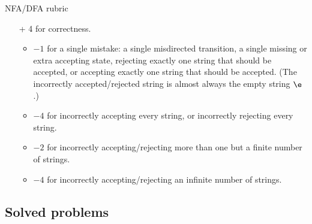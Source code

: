 \documentclass[11pt]{article}
\begin{document}
\begin{enumerate}
\begin{Rubric}{NFA/DFA rubric}
\begin{itemize}
\begin{itemize}
\item Yes, we mean it. A perfectly correct drawing of a perfectly correct DFA with no state explanation
is worth at most 6 points.
\end{itemize}
\item[+ 4] for correctness. 
\begin{itemize}
\item $-1$ for a single mistake: a single misdirected transition, a single missing or extra accepting state,
rejecting exactly one string that should be accepted, or accepting exactly one string that should
be accepted. (The incorrectly accepted/rejected string is almost always the empty string $\e$.)
\item $-4$ for incorrectly accepting every string, or incorrectly rejecting every string.
\item $-2$ for incorrectly accepting/rejecting more than one but a finite number of strings.
\item $-4$ for incorrectly accepting/rejecting an infinite number of strings.
\end{itemize}
\end{itemize}
\end{Rubric}

\end{enumerate}

\newpage

\def\ForceSym#1{\setbox0\hbox{A}\hbox to \wd0{\hss #1\hss}}
\def\Blank{\ForceSym{$\diamond$}}
\def\Enter{\ForceSym{\rotatebox[origin=c]{180}{$\Rsh$}}}	%
\def\Var#1{\ensuremath{\seq{\textsf{#1}}}}

\subsection*{Solved problems}

\def\CPP{{C\nolinebreak[4]\hspace{-.05em}\raisebox{.33ex}{\tiny\bf ++}}}
\end{document}

